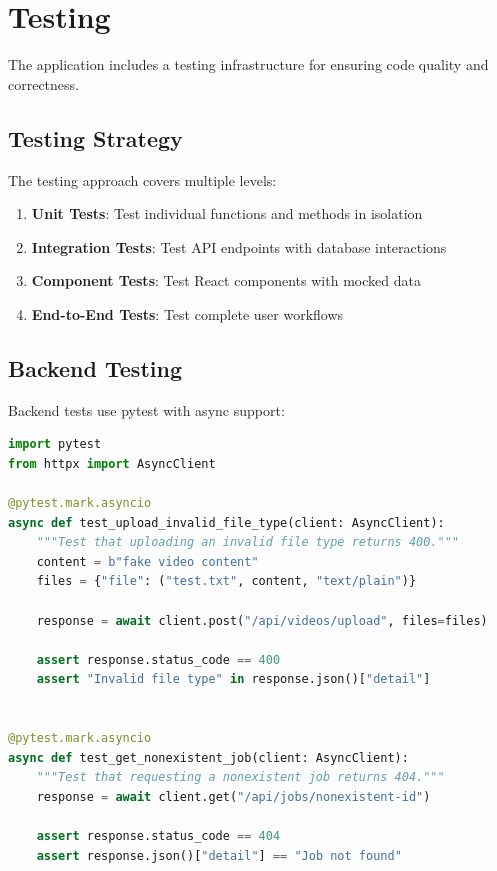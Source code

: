 \section{Testing}
\label{sec:testing}

The application includes a testing infrastructure for ensuring code quality and correctness.

\subsection{Testing Strategy}

The testing approach covers multiple levels:

\begin{enumerate}
    \item \textbf{Unit Tests}: Test individual functions and methods in isolation
    \item \textbf{Integration Tests}: Test API endpoints with database interactions
    \item \textbf{Component Tests}: Test React components with mocked data
    \item \textbf{End-to-End Tests}: Test complete user workflows
\end{enumerate}

\subsection{Backend Testing}

Backend tests use pytest with async support:

\begin{lstlisting}[language=Python, caption={Example API endpoint test}]
import pytest
from httpx import AsyncClient

@pytest.mark.asyncio
async def test_upload_invalid_file_type(client: AsyncClient):
    """Test that uploading an invalid file type returns 400."""
    content = b"fake video content"
    files = {"file": ("test.txt", content, "text/plain")}

    response = await client.post("/api/videos/upload", files=files)

    assert response.status_code == 400
    assert "Invalid file type" in response.json()["detail"]


@pytest.mark.asyncio
async def test_get_nonexistent_job(client: AsyncClient):
    """Test that requesting a nonexistent job returns 404."""
    response = await client.get("/api/jobs/nonexistent-id")

    assert response.status_code == 404
    assert response.json()["detail"] == "Job not found"
\end{lstlisting}

